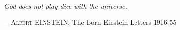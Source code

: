 \documentclass[publish, glossary]{thesis}
\begin{document}
	\frontmatter
	
	
        \null\cleardoublepage

        \vspace*{\fill}
        \epigraph{\itshape God does not play dice with the universe.}{---\textsc{Albert EINSTEIN}, The Born-Einstein Letters 1916-55}

        \null\cleardoublepage
	
	\linenumbers
		
	
	\tableofcontents
	
	\cleardoublepage
	
	\mainmatter	
	
	
        
	
	
	
	
	
	
	

        \glsaddall
        \printglossary
        
	\backmatter
\end{document}
